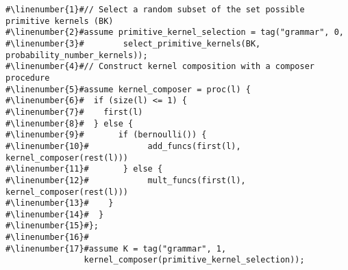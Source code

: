 \begin{mdframed}
\begin{minipage}{\linewidth}
\small
\belowcaptionskip=-10pt
\begin{lstlisting}[mathescape,label=alg:grammar,basicstyle=\selectfont\ttfamily,numbers=none,caption={
Stochastic Grammar},escapechar=\#]
#\linenumber{1}#// Select a random subset of the set possible primitive kernels (BK)
#\linenumber{2}#assume primitive_kernel_selection = tag("grammar", 0,
#\linenumber{3}#	    select_primitive_kernels(BK, probability_number_kernels));
#\linenumber{4}#// Construct kernel composition with a composer procedure
#\linenumber{5}#assume kernel_composer = proc(l) {
#\linenumber{6}#  if (size(l) <= 1) {
#\linenumber{7}#    first(l)
#\linenumber{8}#  } else {
#\linenumber{9}#       if (bernoulli()) {
#\linenumber{10}#            add_funcs(first(l),  kernel_composer(rest(l)))
#\linenumber{11}#       } else {
#\linenumber{12}#            mult_funcs(first(l), kernel_composer(rest(l)))
#\linenumber{13}#    }
#\linenumber{14}#  }
#\linenumber{15}#};
#\linenumber{16}#
#\linenumber{17}#assume K = tag("grammar", 1,
	        	kernel_composer(primitive_kernel_selection));
\end{lstlisting}

\end{minipage}
\end{mdframed}
